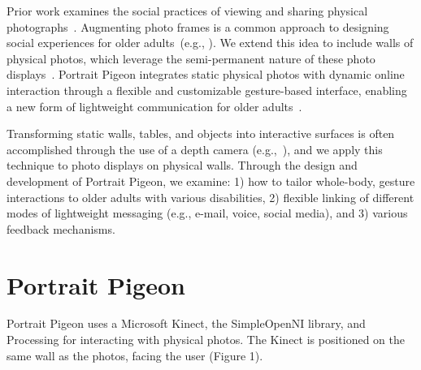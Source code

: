 \documentclass{chi-ext}
\begin{document}
Prior work examines the social practices of viewing and sharing physical photographs~\cite{lindley:2009,Swan2008}. Augmenting photo frames is a common approach to designing social experiences for older adults~(e.g., \cite{arreola:2014,mynatt:2001}). We extend this idea to include walls of physical photos, which leverage the semi-permanent nature of these photo displays~\cite{Swan2008}. Portrait Pigeon integrates static physical photos with dynamic online interaction through a flexible and customizable gesture-based interface, enabling a new form of lightweight communication for older adults~\cite{lindley:2012}.

Transforming static walls, tables, and objects into interactive surfaces is often accomplished through the use of a depth camera (e.g.,~\cite{Corsten2013,Wilson2010}), and we apply this technique to photo displays on physical walls. Through the design and development of Portrait Pigeon, we examine: 1) how to tailor whole-body, gesture interactions to older adults with various disabilities, 2) flexible linking of different modes of lightweight messaging (e.g., e-mail, voice, social media), and 3) various feedback mechanisms. 




\section{Portrait Pigeon}
Portrait Pigeon uses a Microsoft Kinect, the SimpleOpenNI library, and Processing for interacting with physical photos. The Kinect is positioned on the same wall as the photos, facing the user (Figure 1).
\end{document}
